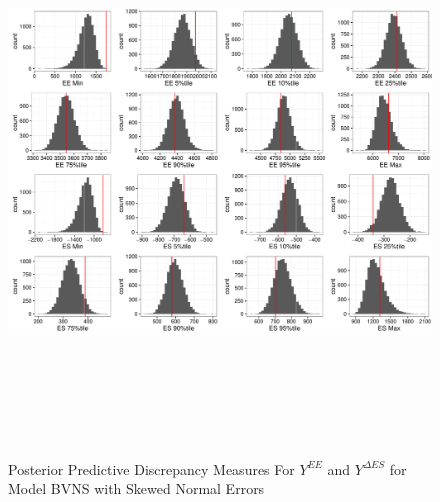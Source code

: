 \documentclass[11pt]{article}\usepackage[]{graphicx}\usepackage[]{color}
\begin{document}
  \begin{figure}
  \centering
  \includegraphics[width=17cm,height=15cm]{manual_figure/wpydiagbvns.pdf}
  \caption{Posterior Predictive Discrepancy Measures For $Y^{EE}$ and $Y^{\Delta ES}$ for Model BVNS with Skewed Normal Errors}
  \label{wpydiagbvns}
  \end{figure}
  
\end{document}

